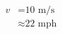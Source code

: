 \documentclass[preview]{standalone}
\begin{document}
\begin{align*}
v &= \text{10 m/s} \\ &\approx \text{22 mph}
\end{align*}
\end{document}
